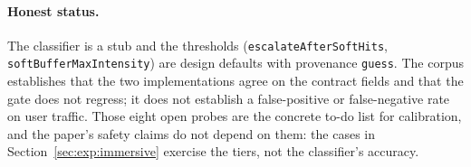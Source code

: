 \paragraph{Honest status.} The classifier is a stub and the thresholds
(\texttt{escalateAfterSoftHits}, \texttt{softBufferMaxIntensity}) are design
defaults with provenance \texttt{guess}. The corpus establishes that the two
implementations agree on the contract fields and that the gate does not regress;
it does not establish a false-positive or false-negative rate on user traffic.
Those eight open probes are the concrete to-do list for calibration, and the
paper's safety claims do not depend on them: the cases in
Section~\ref{sec:exp:immersive} exercise the tiers, not the classifier's
accuracy.
